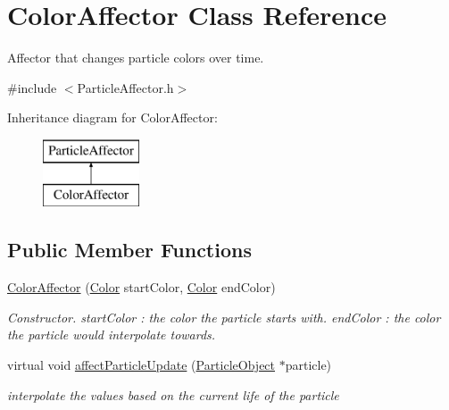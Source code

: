 \hypertarget{class_color_affector}{}\section{Color\+Affector Class Reference}
\label{class_color_affector}


Affector that changes particle colors over time.  




{\ttfamily \#include $<$Particle\+Affector.\+h$>$}

Inheritance diagram for Color\+Affector\+:\begin{figure}[H]
\begin{center}
\leavevmode
\includegraphics[height=2.000000cm]{class_color_affector}
\end{center}
\end{figure}
\subsection*{Public Member Functions}
\begin{DoxyCompactItemize}
\item 
\mbox{\label{class_color_affector_a6e314a66665abd2e74106b8ce4a50180}} 
\mbox{\hyperlink{class_color_affector_a6e314a66665abd2e74106b8ce4a50180}{Color\+Affector}} (\mbox{\hyperlink{class_color}{Color}} start\+Color, \mbox{\hyperlink{class_color}{Color}} end\+Color)
\begin{DoxyCompactList}\small\item\em Constructor. start\+Color \+: the color the particle starts with. end\+Color \+: the color the particle would interpolate towards. \end{DoxyCompactList}\item 
\mbox{\label{class_color_affector_a9c22679295ea62f47af9f1fe9214b9bc}} 
virtual void \mbox{\hyperlink{class_color_affector_a9c22679295ea62f47af9f1fe9214b9bc}{affect\+Particle\+Update}} (\mbox{\hyperlink{class_particle_object}{Particle\+Object}} $\ast$particle)
\begin{DoxyCompactList}\small\item\em interpolate the values based on the current life of the particle \end{DoxyCompactList}\end{DoxyCompactItemize}


